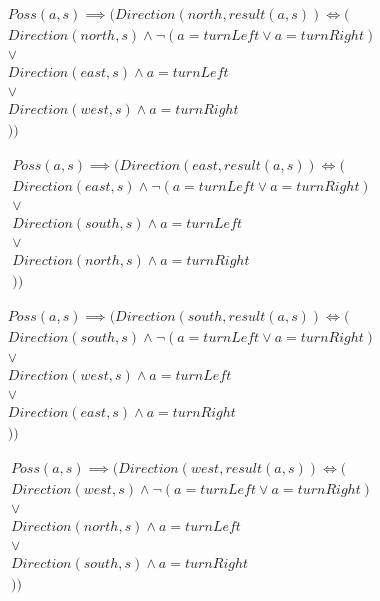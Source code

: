 \documentclass[10pt,\jkfside,a4paper]{article}
\begin{document}
\begin{enumerate}
\begin{gather*}
Poss(a, s) \implies (
Direction(north, result(a, s)) \iff ( \\
Direction(north, s) \wedge \neg (a = turnLeft \vee a = turnRight)
\\
\vee \\
Direction(east, s) \wedge a = turnLeft
\\
\vee \\
Direction(west, s) \wedge a = turnRight
\\
))
\end{gather*}

\begin{gather*}
Poss(a, s) \implies (
Direction(east, result(a, s)) \iff ( \\
Direction(east, s) \wedge \neg (a = turnLeft \vee a = turnRight)
\\
\vee \\
Direction(south, s) \wedge a = turnLeft
\\
\vee \\
Direction(north, s) \wedge a = turnRight
\\
))
\end{gather*}

\begin{gather*}
Poss(a, s) \implies (
Direction(south, result(a, s)) \iff ( \\
Direction(south, s) \wedge \neg (a = turnLeft \vee a = turnRight)
\\
\vee \\
Direction(west, s) \wedge a = turnLeft
\\
\vee \\
Direction(east, s) \wedge a = turnRight
\\
))
\end{gather*}

\begin{gather*}
Poss(a, s) \implies (
Direction(west, result(a, s)) \iff ( \\
Direction(west, s) \wedge \neg (a = turnLeft \vee a = turnRight)
\\
\vee \\
Direction(north, s) \wedge a = turnLeft
\\
\vee \\
Direction(south, s) \wedge a = turnRight
\\
))
\end{gather*}

\end{enumerate}
\end{document}
